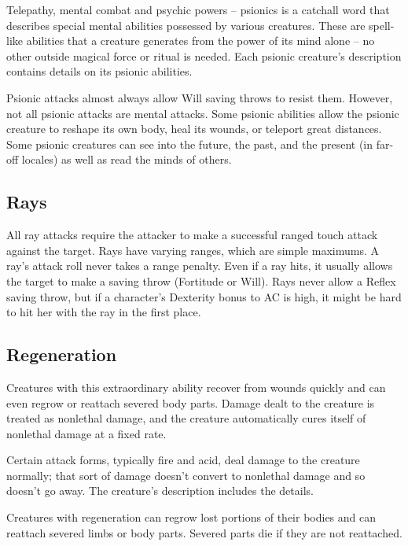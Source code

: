Telepathy, mental combat and psychic powers -- psionics is a catchall word that 
describes special mental abilities possessed by various creatures. These are spell-like 
abilities that a creature generates from the power of its mind alone -- no other 
outside magical force or ritual is needed. Each psionic creature's description 
contains details on its psionic abilities.

Psionic attacks almost always allow Will saving throws to resist them. However, 
not all psionic attacks are mental attacks. Some psionic abilities allow the psionic 
creature to reshape its own body, heal its wounds, or teleport great distances. 
Some psionic creatures can see into the future, the past, and the present (in far-off 
locales) as well as read the minds of others. 

\subsection{Rays}

All ray attacks require the attacker to make a successful ranged touch attack against 
the target. Rays have varying ranges, which are simple maximums. A ray's attack 
roll never takes a range penalty. Even if a ray hits, it usually allows the target 
to make a saving throw (Fortitude or Will). Rays never allow a Reflex saving throw, 
but if a character's Dexterity bonus to AC is high, it might be hard to hit her 
with the ray in the first place.

\subsection{Regeneration}

Creatures with this extraordinary ability recover from wounds quickly and can even 
regrow or reattach severed body parts. Damage dealt to the creature is treated 
as nonlethal damage, and the creature automatically cures itself of nonlethal damage 
at a fixed rate.

Certain attack forms, typically fire and acid, deal damage to the creature normally; 
that sort of damage doesn't convert to nonlethal damage and so doesn't go away. 
The creature's description includes the details.

Creatures with regeneration can regrow lost portions of their bodies and can reattach 
severed limbs or body parts. Severed parts die if they are not reattached.

